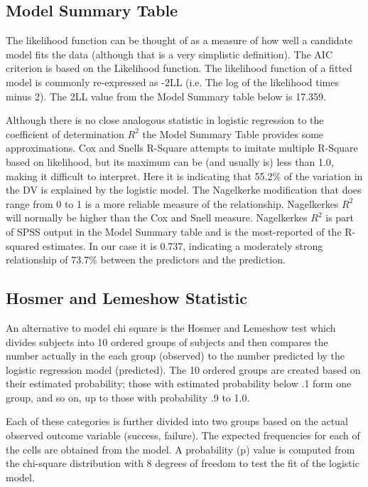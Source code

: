 \documentclass[a4paper,12pt]{article}
\begin{document}
\subsection{Model Summary Table}


The likelihood function can be thought of as a measure of how well a candidate model fits the data (although that is a very simplistic definition). The AIC criterion is based on the Likelihood function.
The likelihood function of a fitted model is commonly re-expressed as -2LL (i.e. The log of the likelihood times minus 2). The 2LL value from the Model Summary table below is 17.359.

Although there is no close analogous statistic in logistic regression to
the coefficient of determination $R^2$ the Model Summary Table provides some approximations. Cox and Snells R-Square attempts to imitate multiple R-Square based on likelihood, but its maximum can be (and usually is) less than 1.0, making it difficult to interpret. Here it is indicating that 55.2\% of the variation in the DV is explained by the
logistic model. The Nagelkerke modification that does range from 0 to 1 is a more reliable
measure of the relationship. Nagelkerkes $R^2$ will normally be higher than the Cox and Snell measure. Nagelkerkes $R^2$ is part of SPSS output in the Model Summary table and is the most-reported of the R-squared estimates. In our case it is 0.737, indicating a moderately strong relationship of 73.7\% between the predictors and the prediction.
\newpage
\subsection{Hosmer and Lemeshow  Statistic}
An alternative to model chi square is the Hosmer and Lemeshow test
which divides subjects into 10 ordered groups of subjects and then compares the number
actually in the each group (observed) to the number predicted by the logistic regression
model (predicted). The 10 ordered groups are created based on their estimated probability; those with estimated probability below .1 form one group, and so on, up to those with probability .9 to 1.0.

Each of these categories is further divided into two groups based on the actual observed outcome variable (success, failure). The expected frequencies for each of the cells are obtained from the model. A probability (p) value is
computed from the chi-square distribution with 8 degrees of freedom to test the fit of the logistic model.
\end{document}
